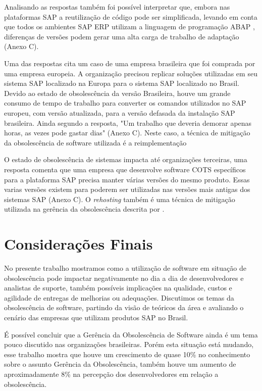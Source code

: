 Analisando as respostas também foi possível interpretar que, embora nas plataformas SAP a reutilização de código pode ser simplificada, levando em conta que todos os ambientes SAP ERP utilizam a linguagem de programação ABAP \cite{abapcontext}, diferenças de versões podem gerar uma alta carga de trabalho de adaptação (Anexo C).

Uma das respostas cita um caso de uma empresa brasileira que foi comprada por uma empresa europeia.
A organização precisou replicar soluções utilizadas em seu sistema SAP localizado na Europa para o sistema SAP localizado no Brasil. Devido ao estado de obsolescência da versão Brasileira, houve um grande consumo de tempo de trabalho para converter os comandos utilizados no SAP europeu, com versão atualizada, para a versão defasada da instalação SAP brasileira. Ainda segundo a resposta, "Um trabalho que deveria demorar apenas horas, as vezes pode gastar dias"  (Anexo C). 
Neste caso, a técnica de mitigação da obsolescência de software utilizada é a reimplementação \cite{sandborn2007}

O estado de obsolescência de sistemas impacta até organizações terceiras, uma resposta comenta que uma empresa que desenvolve software COTS específicos para a plataforma SAP precisa manter várias versões do mesmo produto. Essas varias versões existem para poderem ser utilizadas nas versões mais antigas dos sistemas SAP (Anexo C). O \textit{rehosting} também é uma técnica de mitigação utilizada na gerência da obsolescência descrita por .

\section{\esp Considerações Finais}
No presente trabalho mostramos como a utilização de software em situação de obsolescência pode impactar negativamente no dia a dia de desenvolvedores e analistas de suporte, também possíveis  implicações na qualidade, custos e agilidade de entregas de melhorias ou adequações. Discutimos os temas da obsolescência de software, partindo da visão de teóricos da área e avaliando o cenário  das empresas que utilizam produtos SAP no Brasil.

É possível concluir que a Gerência da Obsolescência de Software ainda é um tema pouco discutido nas organizações brasileiras. Porém esta situação está mudando, esse trabalho mostra que houve um crescimento de quase 10\% no conhecimento sobre o assunto Gerência da Obsolescência, também houve um aumento de aproximadamente 8\% na percepção dos desenvolvedores em relação a obsolescência.

